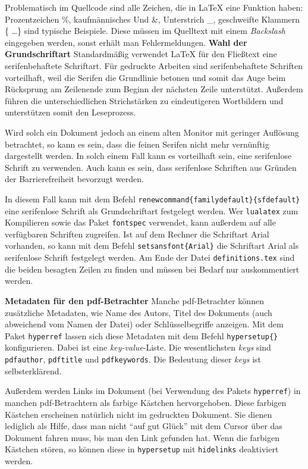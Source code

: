 \par
Problematisch im Quellcode sind alle Zeichen, die in \LaTeX{} eine Funktion haben: Prozentzeichen \%, kaufmännisches Und \&, Unterstrich \_, geschweifte Klammern \{ \ldots\} sind typische Beispiele. Diese müssen im Quelltext mit einem \emph{Backslash} eingegeben werden, sonst erhält man Fehlermeldungen.
%
\textbf{Wahl der Grundschriftart}
Standardmäßig verwendet \LaTeX{} für den Fließtext eine serifenbehaftete
Schriftart. Für gedruckte Arbeiten sind serifenbehaftete Schriften vorteilhaft,
weil die Serifen die Grundlinie betonen und somit das Auge beim Rücksprung am
Zeilenende zum Beginn der nächsten Zeile unterstützt. Außerdem führen die
unterschiedlichen Strichstärken zu eindeutigeren Wortbildern und unterstützen
somit den Leseprozess.

Wird solch ein Dokument jedoch an einem alten Monitor mit geringer Auflösung 
betrachtet, so kann es sein, dass die feinen Serifen nicht mehr vernünftig 
dargestellt werden. In solch einem Fall kann es vorteilhaft sein, eine
serifenlose Schrift zu verwenden. Auch kann es sein, dass serifenlose Schriften
aus Gründen der Barrierefreiheit bevorzugt werden.

In diesem Fall kann mit dem Befehl
\texttt{\tb renewcommand\{\tb familydefault\}\{\tb sfdefault\}} eine
serifenlose Schrift als Grundschriftart festgelegt werden. Wer 
\texttt{lualatex} zum Kompilieren sowie das Paket \texttt{fontspec} verwendet,
kann außerdem auf alle verfügbaren Schriften zugreifen. Ist auf dem Rechner
die Schriftart Arial vorhanden, so kann mit dem Befehl
\texttt{\tb setsansfont\{Arial\}} die Schriftart Arial als serifenlose
Schrift festgelegt werden. Am Ende der Datei \texttt{definitions.tex} sind
die beiden besagten Zeilen zu finden und müssen bei Bedarf nur auskommentiert
werden.

\textbf{Metadaten für den pdf-Betrachter}
Manche pdf-Betrachter können zusätzliche Metadaten, wie Name des Autors, Titel 
des Dokuments (auch abweichend vom Namen der Datei) oder Schlüsselbegriffe 
anzeigen. Mit dem Paket \texttt{hyperref} lassen sich diese Metadaten mit
dem Befehl \texttt{\tb hypersetup\{\}} konfigurieren.
Dabei ist  eine \emph{key-value}-Liste. Die wesentlichsten
\emph{keys} sind \texttt{pdfauthor}, \texttt{pdftitle} und
\texttt{pdfkeywords}. Die Bedeutung dieser \emph{keys} ist selbsterklärend.

Außerdem werden Links im Dokument (bei Verwendung des Pakets \texttt{hyperref})
in manchen pdf-Betrachtern als farbige Kästchen hervorgehoben. Diese farbigen
Kästchen erscheinen natürlich nicht im gedruckten Dokument. Sie dienen 
lediglich als Hilfe, dass man nicht \enquote{auf gut Glück} mit dem Cursor
über das Dokument fahren muss, bis man den Link gefunden hat. Wenn die
farbigen Kästchen stören, so können diese in \texttt{\tb hypersetup} mit
\texttt{hidelinks} deaktiviert werden.


